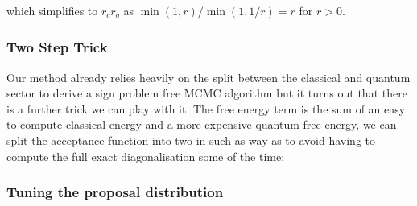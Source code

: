 which simplifies to \(r_c r_q\) as \(\min(1,r)/\min(1,1/r) = r\) for \(r > 0\).

\hypertarget{two-step-trick-1}{%
\subsubsection{Two Step Trick}\label{two-step-trick-1}}

Our method already relies heavily on the split between the classical and quantum sector to derive a sign problem free MCMC algorithm but it turns out that there is a further trick we can play with it. The free energy term is the sum of an easy to compute classical energy and a more expensive quantum free energy, we can split the acceptance function into two in such as way as to avoid having to compute the full exact diagonalisation some of the time:

\begin{Shaded}
\begin{Highlighting}[]

\OperatorTok{=}

 
\OperatorTok{=}

\OperatorTok{=}
    \OperatorTok{{-}}\OperatorTok{*}\OperatorTok{\textless{}}\NormalTok{,}\NormalTok{):}
\OperatorTok{=}
    
        \OperatorTok{{-}}\OperatorTok{*}\OperatorTok{\textless{}}\NormalTok{,}\NormalTok{):}
\OperatorTok{=}
    
\OperatorTok{=}
    
\end{Highlighting}
\end{Shaded}

\hypertarget{tuning-the-proposal-distribution}{%
\subsubsection{Tuning the proposal distribution}\label{tuning-the-proposal-distribution}}

